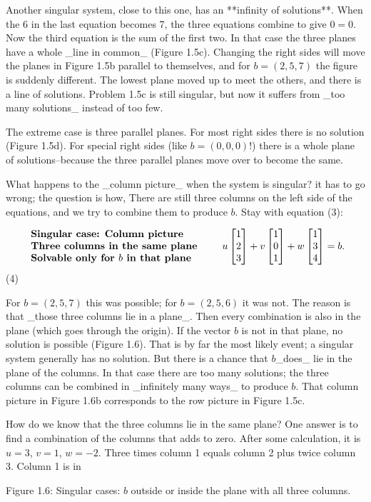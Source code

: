 Another singular system, close to this one, has an **infinity of solutions**. When the 6 in the last equation becomes 7, the three equations combine to give \(0=0\). Now the third equation is the sum of the first two. In that case the three planes have a whole _line in common_ (Figure 1.5c). Changing the right sides will move the planes in Figure 1.5b parallel to themselves, and for \(b=(2,5,7)\) the figure is suddenly different. The lowest plane moved up to meet the others, and there is a line of solutions. Problem 1.5c is still singular, but now it suffers from _too many solutions_ instead of too few.

The extreme case is three parallel planes. For most right sides there is no solution (Figure 1.5d). For special right sides (like \(b=(0,0,0)\)!) there is a whole plane of solutions--because the three parallel planes move over to become the same.

What happens to the _column picture_ when the system is singular? it has to go wrong; the question is how, There are still three columns on the left side of the equations, and we try to combine them to produce \(b\). Stay with equation (3):

\[\begin{array}{ll}\mbox{\bf Singular case: Column picture}\\ \mbox{\bf Three columns in the same plane}\\ \mbox{\bf Solvable only for $b$ in that plane}\end{array}\qquad u\begin{bmatrix}1\\ 2\\ 3\end{bmatrix}+v\begin{bmatrix}1\\ 0\\ 1\end{bmatrix}+w\begin{bmatrix}1\\ 3\\ 4\end{bmatrix}=b.\] (4)

For \(b=(2,5,7)\) this was possible; for \(b=(2,5,6)\) it was not. The reason is that _those three columns lie in a plane_. Then every combination is also in the plane (which goes through the origin). If the vector \(b\) is not in that plane, no solution is possible (Figure 1.6). That is by far the most likely event; a singular system generally has no solution. But there is a chance that \(b\)_does_ lie in the plane of the columns. In that case there are too many solutions; the three columns can be combined in _infinitely many ways_ to produce \(b\). That column picture in Figure 1.6b corresponds to the row picture in Figure 1.5c.

How do we know that the three columns lie in the same plane? One answer is to find a combination of the columns that adds to zero. After some calculation, it is \(u=3\), \(v=1\), \(w=-2\). Three times column 1 equals column 2 plus twice column 3. Column 1 is in

Figure 1.6: Singular cases: \(b\) outside or inside the plane with all three columns.

 